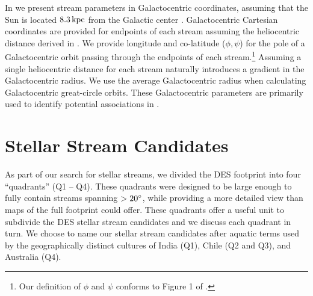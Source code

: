 \documentclass[twocolumn]{aastex61}
\begin{document}
In  we present stream parameters in Galactocentric coordinates, assuming that the Sun is located $8.3\mathrm{\,kpc}$ from the Galactic center \citep{deGrijs:2016, Gillessen:2009}.
Galactocentric Cartesian coordinates are provided for endpoints of each stream assuming the heliocentric distance derived in .
We provide longitude and co-latitude ($\phi,\psi$) for the pole of a Galactocentric orbit passing through the endpoints of each stream.\footnote{Our definition of $\phi$ and $\psi$ conforms to Figure 1 of \citet[][]{Erkal:2016}.}
Assuming a single heliocentric distance for each stream naturally introduces a gradient in the Galactocentric radius. 
We use the average Galactocentric radius when calculating Galactocentric great-circle orbits.
These Galactocentric parameters are primarily used to identify potential associations in .

\section{Stellar Stream Candidates}
\label{sec:streams}

As part of our search for stellar streams, we divided the DES footprint into four ``quadrants'' (Q1 -- Q4).
These quadrants were designed to be large enough to fully contain streams spanning $>20{}^{\circ}$, while providing a more detailed view than maps of the full footprint could offer.
These quadrants offer a useful unit to subdivide the DES stellar stream candidates and we discuss each quadrant in turn.
We choose to name our stellar stream candidates after aquatic terms used by the geographically distinct cultures of India (Q1), Chile (Q2 and Q3), and Australia (Q4).
\end{document}
